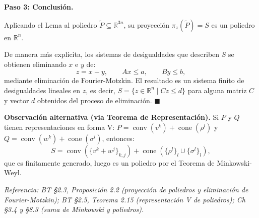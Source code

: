 \documentclass{article}
\begin{document}
\medskip
\noindent\textbf{Paso 3: Conclusión.}

Aplicando el Lema al poliedro $\tilde{P} \subseteq \mathbb{R}^{3n}$, su proyección $\pi_z(\tilde{P}) = S$ es un poliedro en $\mathbb{R}^n$.

De manera más explícita, los sistemas de desigualdades que describen $S$ se obtienen eliminando $x$ e $y$ de:
\[
z = x + y, \qquad Ax \leq a, \qquad By \leq b,
\]
mediante eliminación de Fourier-Motzkin. El resultado es un sistema finito de desigualdades lineales en $z$, es decir, $S = \{z \in \mathbb{R}^n \mid Cz \leq d\}$ para alguna matriz $C$ y vector $d$ obtenidos del proceso de eliminación. $\blacksquare$

\textbf{Observación alternativa (via Teorema de Representación).} Si $P$ y $Q$ tienen representaciones en forma V: $P = \operatorname{conv}(v^k) + \operatorname{cone}(\rho^l)$ y $Q = \operatorname{conv}(w^k) + \operatorname{cone}(\sigma^l)$, entonces:
\[
S = \operatorname{conv}(\{v^k + w^j\}_{k,j}) + \operatorname{cone}(\{\rho^l\}_l \cup \{\sigma^l\}_l),
\]
que es finitamente generado, luego es un poliedro por el Teorema de Minkowski-Weyl.

\medskip\noindent\textit{Referencia: BT §2.3, Proposición 2.2 (proyección de poliedros y eliminación de Fourier-Motzkin); BT §2.5, Teorema 2.15 (representación V de poliedros); Ch §3.4 y §8.3 (suma de Minkowski y poliedros).}
\end{document}
